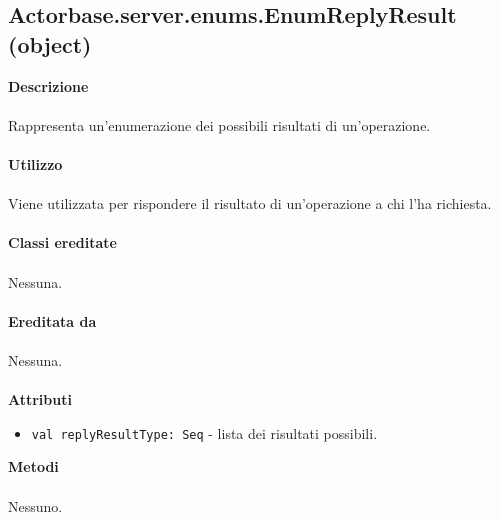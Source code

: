 \documentclass[a4paper]{article}
\begin{document}
			\subsection{Actorbase.server.enums.EnumReplyResult (object)}
		\textbf{Descrizione}
			\\ \\
			Rappresenta un'enumerazione dei possibili risultati di un'operazione.
			\\ \\
		\textbf{Utilizzo}
			\\ \\
			Viene utilizzata per rispondere il risultato di un'operazione a chi l'ha richiesta.
			\\ \\
		\textbf{Classi ereditate}
		\\ \\
			Nessuna.
		\\ \\
		\textbf{Ereditata da}
		\\ \\
			Nessuna.
		\\ \\
		\textbf{Attributi}
			\begin{itemize}
				\item \texttt{val replyResultType: Seq} - lista dei risultati possibili.
			\end{itemize}
		\textbf{Metodi}
			\\ \\
			Nessuno.
		
\end{document}
